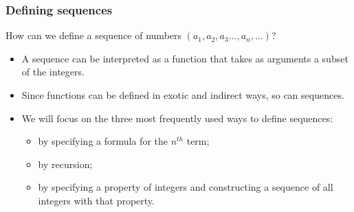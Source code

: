 \begin{frame}
\frametitle{Defining sequences}
\begin{question}
How can we define a sequence of numbers $\left(a_1, a_2, a_3 \dots, a_n, \dots \right)$?
\end{question}
\begin{itemize}
\item<2-> A sequence can be interpreted as a function that takes as arguments a subset of the integers. 
\item<3-> Since functions can be defined in exotic and indirect ways, so can sequences. 
\item<4-> We will focus on the three most frequently used ways to define sequences:
\begin{itemize}
\item<5-> by specifying a formula for the $n^{th}$ term;
\item<6-> by recursion;
\item<7-> by specifying a property of integers and constructing a sequence of all integers with that property.
\end{itemize}
\end{itemize}
\end{frame}
